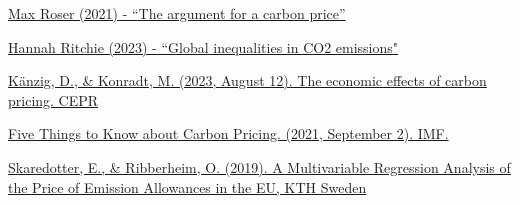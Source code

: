 \documentclass[12pt]{article}
\begin{document}
\begin{thebibliography}{9}
\printbibliography[title=References]

\bibitem{}
\href{https://ourworldindata.org/carbon-price}{Max Roser (2021) - “The argument for a carbon price”}

\bibitem{}
\href{https://ourworldindata.org/inequality-co2}{Hannah Ritchie (2023) - “Global inequalities in CO2 emissions"}

\bibitem{}
\href{https://cepr.org/voxeu/columns/economic-effects-carbon-pricing}{Känzig, D., \& Konradt, M. (2023, August 12). The economic effects of carbon    pricing. CEPR}

\bibitem{}
\href{https://www.imf.org/en/Publications/fandd/issues/2021/09/five-things-to-know-about-carbon-pricing-parry}{Five Things to Know about Carbon Pricing. (2021, September 2). IMF.}

\bibitem{}
\href{}{Skaredotter, E., \& Ribberheim, O. (2019). A Multivariable Regression Analysis of the Price of Emission Allowances in the EU, KTH Sweden}

\end{thebibliography}
\end{document}
